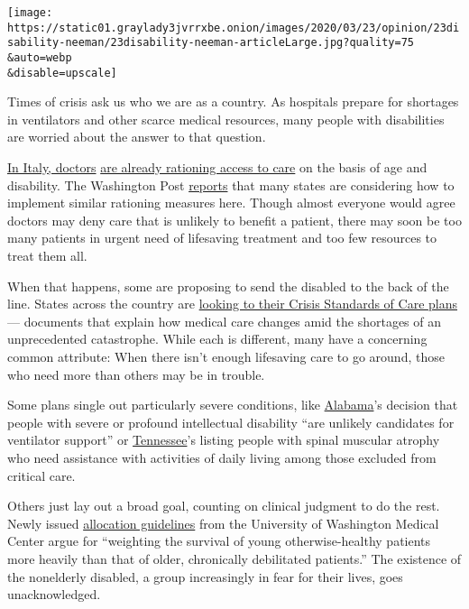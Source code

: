 \texttt{[image: https://static01.graylady3jvrrxbe.onion/images/2020/03/23/opinion/23disability-neeman/23disability-neeman-articleLarge.jpg?quality=75\\\&auto=webp\\\&disable=upscale]}

Times of crisis ask us who we are as a country. As hospitals prepare for
shortages in ventilators and other scarce medical resources, many people
with disabilities are worried about the answer to that question.

\href{http://www.siaarti.it/SiteAssets/News/COVID19\%20-\%20documenti\%20SIAARTI/SIAARTI\%20-\%20Covid19\%20-\%20Raccomandazioni\%20di\%20etica\%20clinica.pdf}{In
Italy, doctors}
\href{https://www.theatlantic.com/ideas/archive/2020/03/who-gets-hospital-bed/607807/}{are
already rationing access to care} on the basis of age and disability.
The Washington Post
\href{https://www.washingtonpost.com/health/2020/03/15/coronavirus-rationing-us/}{reports}
that many states are considering how to implement similar rationing
measures here. Though almost everyone would agree doctors may deny care
that is unlikely to benefit a patient, there may soon be too many
patients in urgent need of lifesaving treatment and too few resources to
treat them all.

When that happens, some are proposing to send the disabled to the back
of the line. States across the country are
\href{https://www.washingtonpost.com/health/2020/03/15/coronavirus-rationing-us/?fbclid=IwAR057A8cmTE1u90ZhjhyWMIkK7gnDmOE1l6FrKBOZE8BUSEgYTtFr7Nl9_w}{looking
to their Crisis Standards of Care plans} --- documents that explain how
medical care changes amid the shortages of an unprecedented catastrophe.
While each is different, many have a concerning common attribute: When
there isn't enough lifesaving care to go around, those who need more
than others may be in trouble.

Some plans single out particularly severe conditions, like
\href{http://www.adph.org/CEP/assets/VENTTRIAGE.pdf}{Alabama}'s decision
that people with severe or profound intellectual disability ``are
unlikely candidates for ventilator support'' or
\href{https://www.tn.gov/content/dam/tn/health/documents/2016_Guidance_for_the_Ethical_Allocation_of_Scarce_Resources.pdf}{Tennessee}'s
listing people with spinal muscular atrophy who need assistance with
activities of daily living among those excluded from critical care.

Others just lay out a broad goal, counting on clinical judgment to do
the rest. Newly issued
\href{https://covid-19.uwmedicine.org/Screening\%20and\%20Testing\%20Algorithms/Other\%20Inpatient\%20Clinical\%20Guidance/Clinical\%20Care\%20in\%20ICU/Material\%20Resource\%20Allocation.COVID19.docx}{allocation
guidelines} from the University of Washington Medical Center argue for
``weighting the survival of young otherwise-healthy patients more
heavily than that of older, chronically debilitated patients.'' The
existence of the nonelderly disabled, a group increasingly in fear for
their lives, goes unacknowledged.

